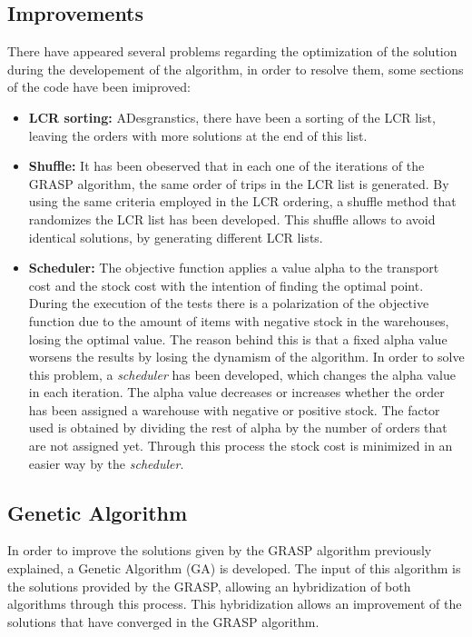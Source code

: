\documentclass[letterpaper]{article} %
\begin{document}
\subsection*{Improvements}
There have appeared several problems regarding the optimization of the solution during the developement of the algorithm, in order to resolve them, some sections of the code have been imiproved:
\begin{itemize}
    \item \textbf{LCR sorting:} ADesgranstics, there have been a sorting of the LCR list, leaving the orders with more solutions at the end of this list.
    \item \textbf{Shuffle:} It has been obeserved that in each one of the iterations of the GRASP algorithm, the same order of trips in the LCR list is generated. By using the same criteria employed in the LCR ordering, a shuffle method that randomizes the LCR list has been developed. This shuffle allows to avoid identical solutions, by generating different LCR lists.
    \item \textbf{Scheduler:} The objective function applies a value alpha to the transport cost and the stock cost with the intention of finding the optimal point. During the execution of the tests there is a polarization of the objective function due to the amount of items with negative stock in the warehouses, losing the optimal value. The reason behind this is that a fixed alpha value worsens the results by losing the dynamism of the algorithm. In order to solve this problem, a \textit{scheduler} has been developed, which changes the alpha value in each iteration. The alpha value decreases or increases whether the order has been assigned a warehouse with negative or positive stock. The factor used is obtained by dividing the rest of alpha by the number of orders that are not assigned yet. Through this process the stock cost is minimized in an easier way by the \textit{scheduler}.
    
\end{itemize}

\subsection*{Genetic Algorithm}
In order to improve the solutions given by the GRASP algorithm previously explained, a Genetic Algorithm (GA) is developed. The input of this algorithm is the solutions provided by the GRASP, allowing an hybridization of both algorithms through this process. This hybridization allows an improvement of the solutions that have converged in the GRASP algorithm.
\end{document}
